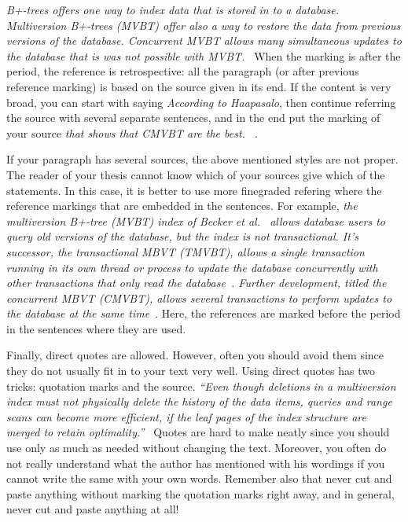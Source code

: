 \documentclass[12pt,a4paper,oneside,pdftex]{report}
\begin{document}
\emph{B+-trees offers one way to index data that is stored in to a
  database. Multiversion B+-trees (MVBT) offer also a way to restore
  the data from previous versions of the database. Concurrent MVBT
  allows many simultaneous updates to the database that is was not
  possible with MVBT.~\cite{HaapasaloThesis}} When the marking is
after the period, the reference is retrospective: all the paragraph
(or after previous reference marking) is based on the source given in
its end. If the content is very broad, you can start with saying
\emph{According to Haapasalo}, then continue referring the source with
several separate sentences, and in the end put the marking of your
source \emph{ that shows that CMVBT are the
  best. ~\cite{HaapasaloThesis}}.

If your paragraph has several sources, the above mentioned styles are
not proper. The reader of your thesis cannot know which of your
sources give which of the statements. In this case, it is better to
use more finegraded refering where the reference markings that are
embedded in the sentences. For example, \emph{the multiversion B+-tree
  (MVBT) index of Becker et al.~\cite{becker:1996:mvbt} allows database
  users to query old versions of the database, but the index is not
  transactional.
  It's successor, the transactional MBVT (TMVBT), allows a single transaction
  running in its own thread or process to update the database concurrently
  with other transactions that only read the
  database~\cite{haapasalo:2009:tmvbt}.
  Further development, titled the concurrent MBVT (CMVBT),
  allows several transactions to perform updates to the database at the same
  time~\cite{HaapasaloThesis}}.
  Here, the references are marked before
  the period in the sentences where they are used.

Finally, direct quotes are allowed. However, often you should avoid
them since they do not usually fit in to your text very well. Using
direct quotes has two tricks: quotation marks and the source.  \emph{
  ``Even though deletions in a multiversion index must not physically
  delete the history of the data items, queries and range scans can
  become more efficient, if the leaf pages of the index structure are
  merged to retain optimality.''~\cite{HaapasaloThesis}} Quotes are
hard to make neatly since you should use only as much as needed
without changing the text. Moreover, you often do not really
understand what the author has mentioned with his wordings if you
cannot write the same with your own words. Remember also that never
cut and paste anything without marking the quotation marks right away,
and in general, never cut and paste anything at all!
\end{document}

